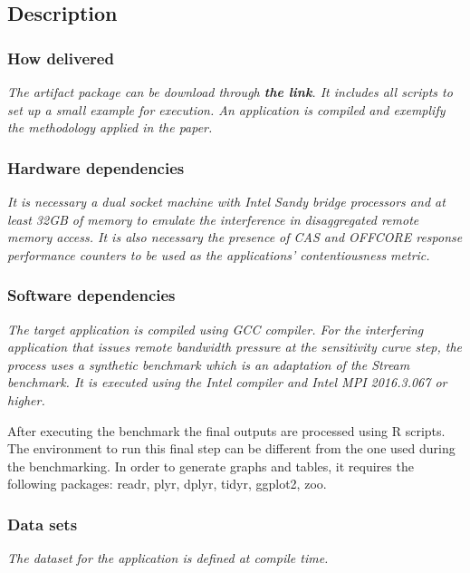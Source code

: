\documentclass{sigplanconf}
\begin{document}
{%
\subsection{Description}

\subsubsection{How delivered}

{\em The artifact package can be download through {\bf the link}. It includes all scripts to set up a small example for execution. An application is compiled and exemplify the methodology applied in the paper. }

\subsubsection{Hardware dependencies}

{\em It is necessary a dual socket machine with Intel Sandy bridge processors and at least 32GB of memory to emulate the interference in disaggregated remote memory access. It is also necessary the presence of CAS and OFFCORE response performance counters to be used as the applications' contentiousness metric. }

\subsubsection{Software dependencies}

{\em The target application is compiled using GCC compiler. For the interfering application that issues remote bandwidth pressure at the sensitivity curve step, the process uses a synthetic benchmark which is an adaptation of the Stream benchmark. It is executed using the Intel compiler and Intel MPI 2016.3.067 or higher.

After executing the benchmark the final outputs are processed using R scripts. The environment to run this final step can be different from the one used during the benchmarking. In order to generate graphs and tables, it requires the following packages: readr, plyr, dplyr, tidyr, ggplot2, zoo. 
}

\subsubsection{Data sets}

{\em The dataset for the application is defined at compile time.}

}
\end{document}
